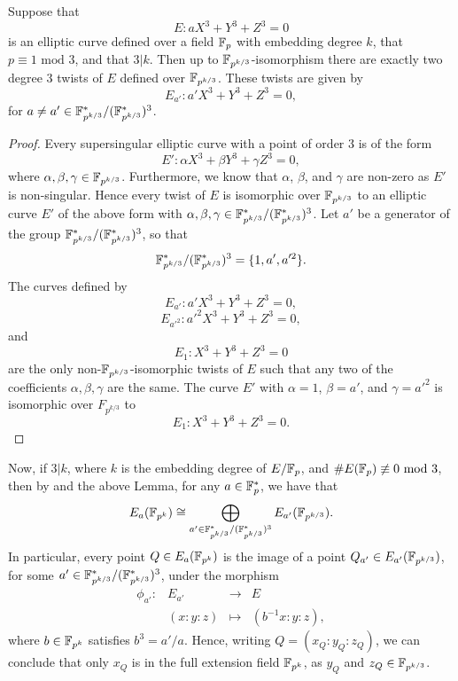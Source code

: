 \begin{lemma}
Suppose that
\[E: aX^{3} + Y^{3} + Z^{3} = 0\] is an elliptic curve defined over a field $\mathbb{F}_{p}$ with embedding degree $k$, that $p \equiv 1 \text{ mod } 3$, and that $3|k$. Then up to $\mathbb{F}_{p^{k/3}}$-isomorphism there are exactly two degree 3 twists of $E$ defined over $\mathbb{F}_{p^{k/3}}$. These twists are given by
\[E_{a'}: a'X^{3} + Y^{3} + Z^{3} = 0,\] for $a \neq a' \in \mathbb{F}_{p^{k/3}}^{*}/(\mathbb{F}_{p^{k/3}}^{*})^{3}$.
\end{lemma}

\begin{proof}
Every supersingular elliptic curve with a point of order 3 is of the form
\[E': \alpha X^{3} + \beta Y^{3} + \gamma Z^{3} = 0,\] where $\alpha,\beta,\gamma \in \mathbb{F}_{p^{k/3}}$. Furthermore, we know that $\alpha$, $\beta$, and $\gamma$ are non-zero as $E'$ is non-singular. Hence every twist of $E$ is isomorphic over $\mathbb{F}_{p^{k/3}}$ to an elliptic curve $E'$ of the above form with $\alpha,\beta,\gamma \in \mathbb{F}_{p^{k/3}}^{*}/(\mathbb{F}_{p^{k/3}}^{*})^{3}$. Let $a'$ be a generator of the group $\mathbb{F}_{p^{k/3}}^{*}/(\mathbb{F}_{p^{k/3}}^{*})^{3}$, so that
\[\mathbb{F}_{p^{k/3}}^{*}/(\mathbb{F}_{p^{k/3}}^{*})^{3} = \{1,a',a'^{2}\}.\] The curves defined by
\[ E_{a'} : a'X^{3} + Y^{3} + Z^{3} = 0,\] \[E_{a'^{2}} : a'^{2}X^{3} + Y^{3} + Z^{3} = 0,\] and\[ E_{1}: X^{3} + Y^{3} + Z^{3} = 0\] are the only non-$\mathbb{F}_{p^{k/3}}$-isomorphic twists of $E$ such that any two of the coefficients $\alpha,\beta,\gamma$ are the same. The curve $E'$ with $\alpha = 1$, $\beta = a'$, and $\gamma = a'^{2}$ is isomorphic over $F_{p^{k/3}}$ to \[E_{1}: X^{3} + Y^{3} + Z^{3} = 0.\]
\end{proof}

Now, if $3|k$, where $k$ is the embedding degree of $E/\mathbb{F}_{p}$, and $\#E(\mathbb{F}_{p}) \not\equiv 0 \text{ mod } 3$, then by \cite[Theorem 3]{2006/hess} and the above Lemma, for any $a \in \mathbb{F}_{p}^{*}$, we have that
\[E_{a}(\mathbb{F}_{p^{k}}) \cong \bigoplus_{a' \in \mathbb{F}_{p^{k/3}}^{*}/(\mathbb{F}_{p^{k/3}}^{*})^{3}} E_{a'}(\mathbb{F}_{p^{k/3}}).\] 
In particular, every point $Q \in E_{a}(\mathbb{F}_{p^{k}})$ is the image of a point $Q_{a'} \in E_{a'}(\mathbb{F}_{p^{k/3}})$, for some $a' \in \mathbb{F}_{p^{k/3}}^{*}/(\mathbb{F}_{p^{k/3}}^{*})^{3}$, under the morphism
\[\begin{array}{rccc}
\phi_{a'}:& E_{a'} & \longrightarrow & E \\
& (x:y:z) & \mapsto & (b^{-1}x:y:z),
\end{array}\]
where $b \in \mathbb{F}_{p^{k}}$ satisfies $b^{3} = a'/a$. Hence, writing $Q = (x_{Q}:y_{Q}:z_{Q})$, we can conclude that only $x_{Q}$ is in the full extension field $\mathbb{F}_{p^{k}}$, as $y_{Q}$ and $z_{Q} \in \mathbb{F}_{p^{k/3}}$. 
\\

